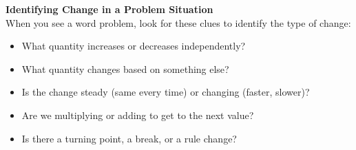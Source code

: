 \documentclass[11pt,landscape]{article}
\begin{document}
\begin{minipage}[t]{0.48\textwidth}
\raggedright
\Large\textbf{Identifying Change in a Problem Situation} \\
\normalsize
\vspace{0.5em}
When you see a word problem, look for these clues to identify the type of change:

\begin{itemize}
\item What quantity increases or decreases independently?
\item What quantity changes based on something else?
\item Is the change steady (same every time) or changing (faster, slower)?
\item Are we multiplying or adding to get to the next value?
\item Is there a turning point, a break, or a rule change?
\end{itemize}
\end{minipage}
\hfill
\end{document}
